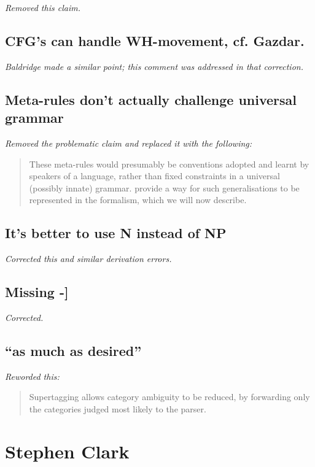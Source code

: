 \emph{Removed this claim.}

\subsection{CFG's can handle WH-movement, cf. Gazdar.}

\emph{Baldridge made a similar point; this comment was addressed in that
correction.}

\subsection{Meta-rules don't actually challenge universal grammar}

\emph{Removed the problematic claim and replaced it with the following:}

\begin{quote}
These meta-rules would presumably be conventions adopted and learnt by speakers
of a language,
rather than fixed constraints in a universal (possibly innate) grammar.
\citet{baldridge:03} provide a way for such generalisations to
be represented in the formalism, which we will now describe.
\end{quote}

\subsection{It's better to use N instead of NP}

\emph{Corrected this and similar derivation errors.}

\subsection{Missing -]}

\emph{Corrected.}

\subsection{``as much as desired''}

\emph{Reworded this:}

\begin{quote}
Supertagging allows category ambiguity to be reduced, by forwarding only the
categories judged most likely to the parser. 
\end{quote}


\section{Stephen Clark}

